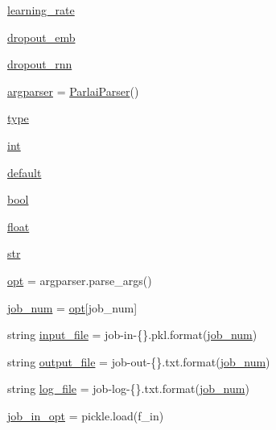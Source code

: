 \begin{DoxyCompactItemize}
\item 
\hyperlink{namespacetrain_a00dfae526f6aa07d0497b80a4ccd9e7c}{learning\+\_\+rate}
\item 
\hyperlink{namespacetrain_a49c9baf0b2032b28aed1f9076b58a13a}{dropout\+\_\+emb}
\item 
\hyperlink{namespacetrain_a1093b38b8f4b2f51bb5d9ed733350a74}{dropout\+\_\+rnn}
\item 
\hyperlink{namespacetrain_a674f48668d3e343c9b06b0b72ca8c458}{argparser} = \hyperlink{classparlai_1_1core_1_1params_1_1ParlaiParser}{Parlai\+Parser}()
\item 
\hyperlink{namespacetrain_ad99775ad96e0996a8be4782b30a28c2e}{type}
\item 
\hyperlink{namespacetrain_af5de906790efe7cea370f1a69e020d52}{int}
\item 
\hyperlink{namespacetrain_abfb9b8d0ebf72bafd04e084791275553}{default}
\item 
\hyperlink{namespacetrain_a366f6877ee8e22a2c2aa569859925e34}{bool}
\item 
\hyperlink{namespacetrain_af6ce307b1ddd4745a96b7834bc0232dc}{float}
\item 
\hyperlink{namespacetrain_aaa59b213583fa39039d4c2a897f9009c}{str}
\item 
\hyperlink{namespacetrain_a8ce47f3ce85e34ed945573b80e08aaf6}{opt} = argparser.\+parse\+\_\+args()
\item 
\hyperlink{namespacetrain_aa21180e9a522633e69afac0c0e608b85}{job\+\_\+num} = \hyperlink{namespacetrain_a8ce47f3ce85e34ed945573b80e08aaf6}{opt}\mbox{[}\textquotesingle{}job\+\_\+num\textquotesingle{}\mbox{]}
\item 
string \hyperlink{namespacetrain_a647c4fb1786c78fdc94676ae8e99581d}{input\+\_\+file} = \textquotesingle{}job-\/in-\/\{\}.pkl\textquotesingle{}.format(\hyperlink{namespacetrain_aa21180e9a522633e69afac0c0e608b85}{job\+\_\+num})
\item 
string \hyperlink{namespacetrain_aeaa702306f07912976fe68c59b1a1bcd}{output\+\_\+file} = \textquotesingle{}job-\/out-\/\{\}.txt\textquotesingle{}.format(\hyperlink{namespacetrain_aa21180e9a522633e69afac0c0e608b85}{job\+\_\+num})
\item 
string \hyperlink{namespacetrain_a30cb844466eb30a5ba783789c8c0f43f}{log\+\_\+file} = \textquotesingle{}job-\/log-\/\{\}.txt\textquotesingle{}.format(\hyperlink{namespacetrain_aa21180e9a522633e69afac0c0e608b85}{job\+\_\+num})
\item 
\hyperlink{namespacetrain_a09cea1b757e4ebbba308040736f37c4f}{job\+\_\+in\+\_\+opt} = pickle.\+load(f\+\_\+in)

\end{DoxyCompactItemize}
